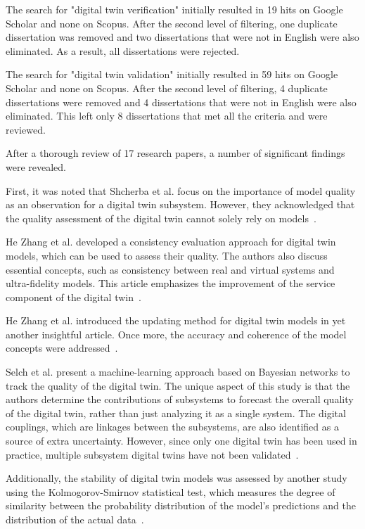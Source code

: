 \documentclass{llncs}
\begin{document}
    The search for "digital twin verification" initially resulted in 19 hits on Google Scholar and none on Scopus. 
    After the second level of filtering, one duplicate dissertation was removed and two dissertations that were not in 
    English were also eliminated. As a result, all dissertations were rejected.

    The search for "digital twin validation" initially resulted in 59 hits on Google Scholar and none on Scopus. 
    After the second level of filtering, 4 duplicate dissertations were removed and 4 
    dissertations that were not in English were also eliminated. This left only 8 dissertations that met all the criteria and were reviewed.
    
    After a thorough review of 17 research papers, a number of significant findings were revealed.
    
    First, it was noted that Shcherba et al.  focus on the importance of model quality as an observation for a digital twin subsystem. 
    However, they acknowledged that the quality assessment of the digital twin cannot solely rely on models~\cite{Shcherba}. 

    He Zhang et al.  developed a consistency evaluation approach for digital twin models, which can be used to assess their quality. 
    The authors also discuss essential concepts, such as consistency between real and virtual systems and ultra-fidelity models. 
    This article emphasizes the improvement of the service component of the digital twin~\cite{ZHANGEVALUATIONMETHOD}.

    He Zhang et al. introduced the updating method for digital twin models in yet another insightful article.
    Once more, the accuracy and coherence of the model concepts were addressed~\cite{ZHANGUPDATEMETHOD}.

    Selch et al.  present a machine-learning approach based on Bayesian networks to track the quality of the digital twin. 
    The unique aspect of this study is that the authors determine the contributions of subsystems to forecast the overall quality of the digital twin, 
    rather than just analyzing it as a single system. The digital couplings, which are linkages between the subsystems, are also identified as a source of extra uncertainty. 
    However, since only one digital twin has been used in practice, multiple subsystem digital twins have not been validated~\cite{QualityMonitoringofCoupledDigitalTwins}.

    Additionally, the stability of digital twin models was assessed by another study using the Kolmogorov-Smirnov statistical test, 
    which measures the degree of similarity between the probability distribution of the model's predictions and the distribution of the actual data~\cite{RadarDigitalTwin}.
\end{document}
